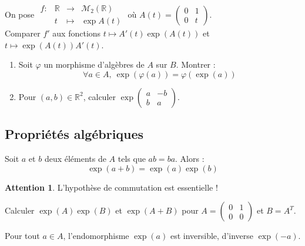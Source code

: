 \documentclass[french]{article}
\newcommand{\R}{\mathbb{R}}
\theoremstyle{plain}
\theoremstyle{definition}
\newtheorem*{attention}{Attention}
\theoremstyle{remark}
\begin{document}
\begin{exo}
	On pose $\begin{array}{lrcl}
		f:&\R&\longrightarrow&\mathcal{M}_2(\R)\\
		&t&\longmapsto&\exp A(t)
	\end{array}$ où $A(t)=\displaystyle\begin{pmatrix}
	0&1\\
	0&t
	\end{pmatrix}$. \\ Comparer $f'$ aux fonctions $t\mapsto A'(t)\exp(A(t))$ et $t\mapsto \exp(A(t))A'(t)$.
\end{exo}

\begin{exo}
	\begin{enumerate}
		\item Soit $\varphi$ un morphisme d'algèbres de $A$ sur $B$. Montrer : $$\forall a\in A,\ \exp(\varphi(a))=\varphi(\exp(a))$$
		\item Pour $(a,b)\in\R^2$, calculer $\exp\displaystyle\begin{pmatrix}
			a&-b\\
			b&a
		\end{pmatrix}$. %
	\end{enumerate}
\end{exo}

\subsection{Propriétés algébriques}

\begin{thm}%
	Soit $a$ et $b$ deux éléments de $A$ tels que $ab=ba$. Alors : $$\exp(a+b)=\exp(a)\exp(b)$$
\end{thm}

\begin{attention}
	L'hypothèse de commutation est essentielle !
\end{attention}

\begin{exo}
	Calculer $\exp(A)\exp(B)$ et $\exp(A+B)$ pour $A=\displaystyle\begin{pmatrix}
		0&1\\
		0&0
	\end{pmatrix}$ et $B=A^T$.
\end{exo}

\begin{cor}%
	Pour tout $a\in A$, l'endomorphisme $\exp(a)$ est inversible, d'inverse $\exp(-a)$.
\end{cor}
\end{document}
